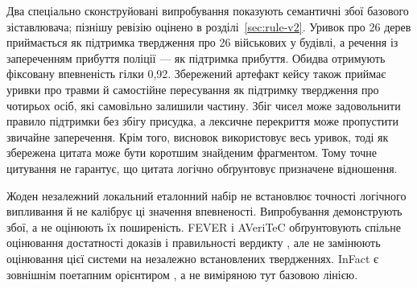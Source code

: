 Два спеціально сконструйовані випробування показують семантичні збої базового зіставлювача; пізнішу ревізію оцінено в розділі~\ref{sec:rule-v2}. Уривок про 26 дерев приймається як підтримка твердження про 26 військових у будівлі, а речення із запереченням прибуття поліції --- як підтримка прибуття. Обидва отримують фіксовану впевненість гілки 0,92. Збережений артефакт кейсу також приймає уривки про травми й самостійне пересування як підтримку твердження про чотирьох осіб, які самовільно залишили частину. Збіг чисел може задовольнити правило підтримки без збігу присудка, а лексичне перекриття може пропустити звичайне заперечення. Крім того, висновок використовує весь уривок, тоді як збережена цитата може бути коротшим знайденим фрагментом. Тому точне цитування не гарантує, що цитата логічно обґрунтовує призначене відношення.

Жоден незалежний локальний еталонний набір не встановлює точності логічного випливання й не калібрує ці значення впевненості. Випробування демонструють збої, а не оцінюють їх поширеність. FEVER і AVeriTeC обґрунтовують спільне оцінювання достатності доказів і правильності вердикту \citep{thorne2018fever,schlichtkrull2023averitec,schlichtkrull2024averitec}, але не замінюють оцінювання цієї системи на незалежно встановлених твердженнях. InFact є зовнішнім поетапним орієнтиром \citep{rothermel2024infact}, а не виміряною тут базовою лінією.
